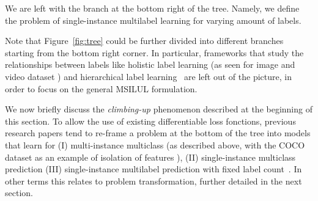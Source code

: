 We are left with the branch at the bottom right of the tree. Namely, we define the problem of single-instance multilabel learning for varying amount of labels.

Note that Figure~\ref{fig:tree} could be further divided into different branches starting from the bottom right corner. In particular, frameworks that study the relationships between labels like holistic label learning (as seen for image \cite{holisticImageDescriptors,holisticLungs} and video dataset \cite{holisticVideoData} ) and hierarchical label learning~\cite{activeLearningMultiLabel, HARAM} are left out of the picture, in order to focus on the general MSILUL formulation.

We now briefly discuss the \emph{climbing-up} phenomenon described at the beginning of this section. To allow the use of existing differentiable loss fonctions, previous research papers tend to re-frame a problem at the bottom of the tree into models that learn for (I) multi-instance multiclass (as described above, with the COCO dataset as an example of isolation of features \cite{COCO}), (II) single-instance multiclass prediction \cite{multiclass} (III) single-instance multilabel prediction with fixed label count~\cite{threshForF1}. In other terms this relates to problem transformation, further detailed in the next section.














